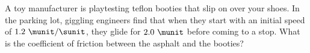 A toy manufacturer is playtesting teflon booties that slip on over
your shoes.  In the parking lot, giggling engineers find that when
they start with an initial speed of $1.2\ \munit/\sunit$, they glide
for $2.0\ \munit$ before coming to a stop. What is the coefficient of
friction between the asphalt and the booties?\answercheck

